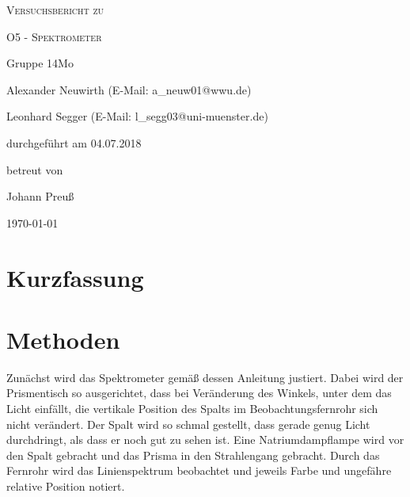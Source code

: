 \documentclass[
	a4paper,
	12pt,
	pagesize,
	ngerman
]{scrartcl}
\begin{document}
	
	\begin{titlepage}
		\centering
		{\scshape\LARGE Versuchsbericht zu \par}
		\vspace{1cm}
		{\scshape\huge O5 - Spektrometer \par}
		\vspace{2.5cm}
		{\LARGE Gruppe 14Mo \par}
		\vspace{0.5cm}
		
		{\large Alexander Neuwirth (E-Mail: a\_neuw01@wwu.de) \par}
		{\large Leonhard Segger (E-Mail: l\_segg03@uni-muenster.de) \par}
		\vfill
		
		durchgeführt am 04.07.2018\par
		betreut von\par
		{\large Johann Preuß} 
		
		\vfill
		
		{\large \today\par}
	\end{titlepage}
	\tableofcontents
	\newpage

	\section{Kurzfassung}
	
	\section{Methoden}
	
	Zunächst wird das Spektrometer gemäß dessen Anleitung justiert.
	Dabei wird der Prismentisch so ausgerichtet, dass bei Veränderung des Winkels, unter dem das Licht einfällt, die vertikale Position des Spalts im Beobachtungsfernrohr sich nicht verändert.
	Der Spalt wird so schmal gestellt, dass gerade genug Licht durchdringt, als dass er noch gut zu sehen ist.
	Eine Natriumdampflampe wird vor den Spalt gebracht und das Prisma in den Strahlengang gebracht.%
	Durch das Fernrohr wird das Linienspektrum beobachtet und jeweils Farbe und ungefähre relative Position notiert.
	
\end{document}
